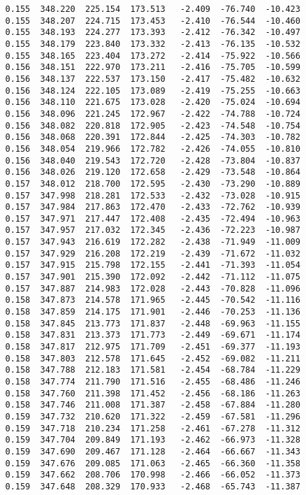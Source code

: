 \begin{verbatim}
   0.155  348.220  225.154  173.513   -2.409  -76.740  -10.423
   0.155  348.207  224.715  173.453   -2.410  -76.544  -10.460
   0.155  348.193  224.277  173.393   -2.412  -76.342  -10.497
   0.155  348.179  223.840  173.332   -2.413  -76.135  -10.532
   0.155  348.165  223.404  173.272   -2.414  -75.922  -10.566
   0.156  348.151  222.970  173.211   -2.416  -75.705  -10.599
   0.156  348.137  222.537  173.150   -2.417  -75.482  -10.632
   0.156  348.124  222.105  173.089   -2.419  -75.255  -10.663
   0.156  348.110  221.675  173.028   -2.420  -75.024  -10.694
   0.156  348.096  221.245  172.967   -2.422  -74.788  -10.724
   0.156  348.082  220.818  172.905   -2.423  -74.548  -10.754
   0.156  348.068  220.391  172.844   -2.425  -74.303  -10.782
   0.156  348.054  219.966  172.782   -2.426  -74.055  -10.810
   0.156  348.040  219.543  172.720   -2.428  -73.804  -10.837
   0.156  348.026  219.120  172.658   -2.429  -73.548  -10.864
   0.157  348.012  218.700  172.595   -2.430  -73.290  -10.889
   0.157  347.998  218.281  172.533   -2.432  -73.028  -10.915
   0.157  347.984  217.863  172.470   -2.433  -72.762  -10.939
   0.157  347.971  217.447  172.408   -2.435  -72.494  -10.963
   0.157  347.957  217.032  172.345   -2.436  -72.223  -10.987
   0.157  347.943  216.619  172.282   -2.438  -71.949  -11.009
   0.157  347.929  216.208  172.219   -2.439  -71.672  -11.032
   0.157  347.915  215.798  172.155   -2.441  -71.393  -11.054
   0.157  347.901  215.390  172.092   -2.442  -71.112  -11.075
   0.157  347.887  214.983  172.028   -2.443  -70.828  -11.096
   0.158  347.873  214.578  171.965   -2.445  -70.542  -11.116
   0.158  347.859  214.175  171.901   -2.446  -70.253  -11.136
   0.158  347.845  213.773  171.837   -2.448  -69.963  -11.155
   0.158  347.831  213.373  171.773   -2.449  -69.671  -11.174
   0.158  347.817  212.975  171.709   -2.451  -69.377  -11.193
   0.158  347.803  212.578  171.645   -2.452  -69.082  -11.211
   0.158  347.788  212.183  171.581   -2.454  -68.784  -11.229
   0.158  347.774  211.790  171.516   -2.455  -68.486  -11.246
   0.158  347.760  211.398  171.452   -2.456  -68.186  -11.263
   0.158  347.746  211.008  171.387   -2.458  -67.884  -11.280
   0.159  347.732  210.620  171.322   -2.459  -67.581  -11.296
   0.159  347.718  210.234  171.258   -2.461  -67.278  -11.312
   0.159  347.704  209.849  171.193   -2.462  -66.973  -11.328
   0.159  347.690  209.467  171.128   -2.464  -66.667  -11.343
   0.159  347.676  209.085  171.063   -2.465  -66.360  -11.358
   0.159  347.662  208.706  170.998   -2.466  -66.052  -11.373
   0.159  347.648  208.329  170.933   -2.468  -65.743  -11.387

\end{verbatim}
